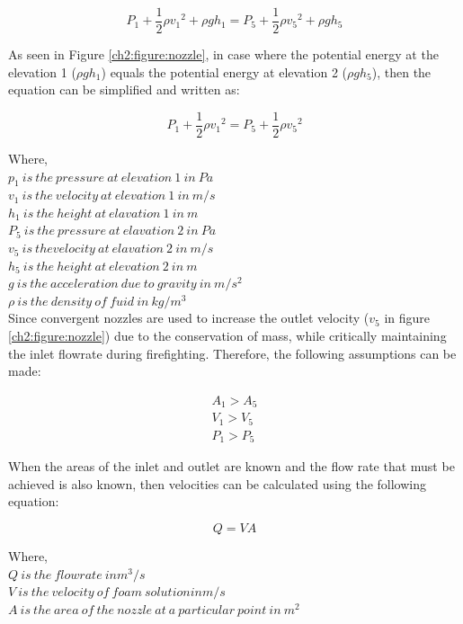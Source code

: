 \documentclass[12pt]{report}
\begin{document}
\begin{equation}
    P_1+\frac{1}{2}\rho{v_1}^2 + \rho gh_1 = P_5+\frac{1}{2}\rho{v_5}^2 + \rho gh_5
\end{equation}

As seen in Figure \ref{ch2:figure:nozzle}, in case where the potential energy at the elevation 1 ($\rho gh_1$) equals the potential energy at elevation 2 ($\rho gh_5$), then the equation can be simplified and written as:

\begin{equation}
    P_1+\frac{1}{2}\rho{v_1}^2 = P_5+\frac{1}{2}\rho{v_5}^2
\end{equation}

\noindent Where, \\
$p_1\ is\ the\ pressure\ at\ elevation\ 1\ in\ Pa$ \\
$v_1\ is\ the\ velocity\ at\ elevation\ 1\ in\ m/s$ \\
$h_1\ is\ the\ height\ at\ elavation\ 1\ in\ m$ \\
$P_5\ is\ the\ pressure\ at\ elavation\ 2\ in\ Pa$ \\
$v_5\ is\ the velocity\ at\ elavation\ 2\ in\ m/s$ \\
$h_5\ is\ the\ height\ at\ elevation\ 2\ in\ m$ \\
$g\ is\ the\ acceleration\ due\ to\ gravity\ in\ m/s^2$ \\
$\rho\ is\ the\ density\ of\ fuid\ in\ kg/m^3$ \\

Since convergent nozzles are used to increase the outlet velocity ($v_5$  in figure \ref{ch2:figure:nozzle}) due to the conservation of mass, while critically maintaining the inlet flowrate during firefighting. Therefore, the following assumptions can be made:

\begin{gather*}
    A_1 > A_5 \\
    V_1 > V_5 \\
    P_1 > P_5
\end{gather*}

When the areas of the inlet and outlet are known and the flow rate that must be achieved is also known, then velocities can be calculated using the following equation:

\begin{equation}
    Q = VA
\end{equation}

\noindent Where,\\
$Q\ is\ the\ flowrate\ in m^3/s$ \\
$V\ is\ the\ velocity\ of\ foam\ solution in m/s$ \\
$A\ is\ the\ area\ of\ the\ nozzle\ at\ a\ particular\ point\ in\ m^2$ \\
\end{document}
